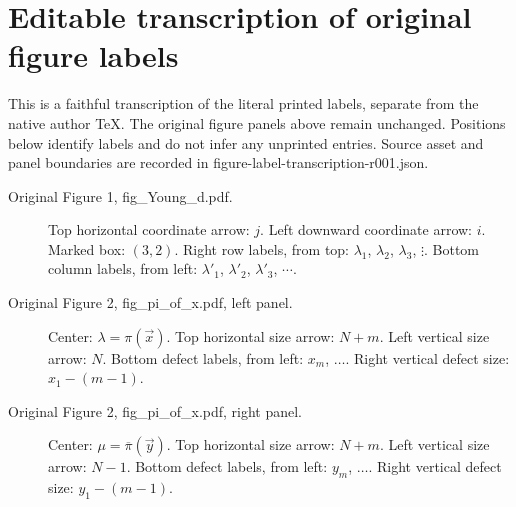 \section*{Editable transcription of original figure labels}
\noindent This is a faithful transcription of the literal printed labels, separate from the native author TeX. The original figure panels above remain unchanged. Positions below identify labels and do not infer any unprinted entries. Source asset and panel boundaries are recorded in figure-label-transcription-r001.json.
\begin{description}
\item[Original Figure 1, fig\_Young\_d.pdf.] Top horizontal coordinate arrow: $j$. Left downward coordinate arrow: $i$. Marked box: $(3,2)$. Right row labels, from top: $\lambda_1$, $\lambda_2$, $\lambda_3$, $\vdots$. Bottom column labels, from left: $\lambda'_1$, $\lambda'_2$, $\lambda'_3$, $\cdots$.
\item[Original Figure 2, fig\_pi\_of\_x.pdf, left panel.] Center: $\lambda=\pi(\vec{x})$. Top horizontal size arrow: $N+m$. Left vertical size arrow: $N$. Bottom defect labels, from left: $x_m$, $\ldots$. Right vertical defect size: $x_1-(m-1)$.
\item[Original Figure 2, fig\_pi\_of\_x.pdf, right panel.] Center: $\mu=\overline{\pi}(\vec{y})$. Top horizontal size arrow: $N+m$. Left vertical size arrow: $N-1$. Bottom defect labels, from left: $y_m$, $\ldots$. Right vertical defect size: $y_1-(m-1)$.
\end{description}
